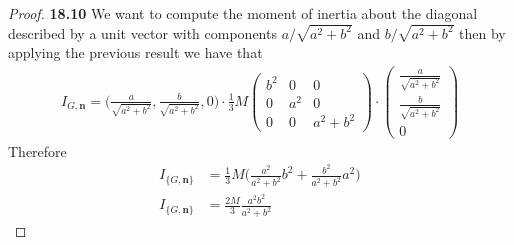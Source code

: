 \documentclass[11pt]{article}
\theoremstyle{definition}
\begin{document}
\begin{proof}{\textbf{18.10}}
    We want to compute the moment of inertia about the diagonal described by 
    a unit vector with components $a/\sqrt{a^2 + b^2}$ and $b/\sqrt{a^2 + b^2}$
    then by applying the previous result we have that
    \begin{align*}
        I_{G, \bm{n}} =
        \bigg(\frac{a}{\sqrt{a^2 + b^2}}, \frac{b}{\sqrt{a^2 + b^2}}, 0\bigg)
        \cdot \frac{1}{3}M\begin{pmatrix}
            b^2 & 0 & 0\\
            0 & a^2 & 0\\
            0 & 0 & a^2 + b^2
        \end{pmatrix}
        \cdot \begin{pmatrix}
            \frac{a}{\sqrt{a^2 + b^2}}\\ \frac{b}{\sqrt{a^2 + b^2}}\\ 0
        \end{pmatrix}
    \end{align*}
    Therefore
    \begin{align*}
        I_{\{G, \bm{n}\}} &= \frac{1}{3}M\bigg(
        \frac{a^2}{a^2 + b^2}b^2 + \frac{b^2}{a^2 + b^2}a^2
        \bigg)\\
        I_{\{G, \bm{n}\}} &= \frac{2M}{3} \frac{a^2b^2}{a^2 + b^2}
    \end{align*}
\end{proof}
\cleardoublepage
\end{document}
